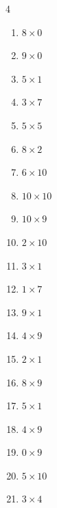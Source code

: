 \begin{multicols}{4}
\begin{enumerate}
  \item $8\times 0$
        \phantom{$=0$}

  \item $9\times 0$
        \phantom{$=0$}

\columnbreak %

  \item $5\times 1$
        \phantom{$=5$}

  \item $3\times 7$
        \phantom{$=21$}

  \item $5\times 5$
        \phantom{$=25$}

  \item $8\times 2$
        \phantom{$=16$}

  \item $6\times 10$
        \phantom{$=60$}

  \item $10\times 10$
        \phantom{$=100$}

  \item $10\times 9$
        \phantom{$=90$}

  \item $2\times 10$
        \phantom{$=20$}

  \item $3\times 1$
        \phantom{$=3$}

  \item $1\times 7$
        \phantom{$=7$}

  \item $9\times 1$
        \phantom{$=9$}

  \item $4\times 9$
        \phantom{$=36$}

  \item $2\times 1$
        \phantom{$=2$}

  \item $8\times 9$
        \phantom{$=72$}

  \item $5\times 1$
        \phantom{$=5$}

  \item $4\times 9$
        \phantom{$=36$}

  \item $0\times 9$
        \phantom{$=0$}

  \item $5\times 10$
        \phantom{$=50$}

  \item $3\times 4$
        \phantom{$=12$}


\end{enumerate}
\end{multicols}
